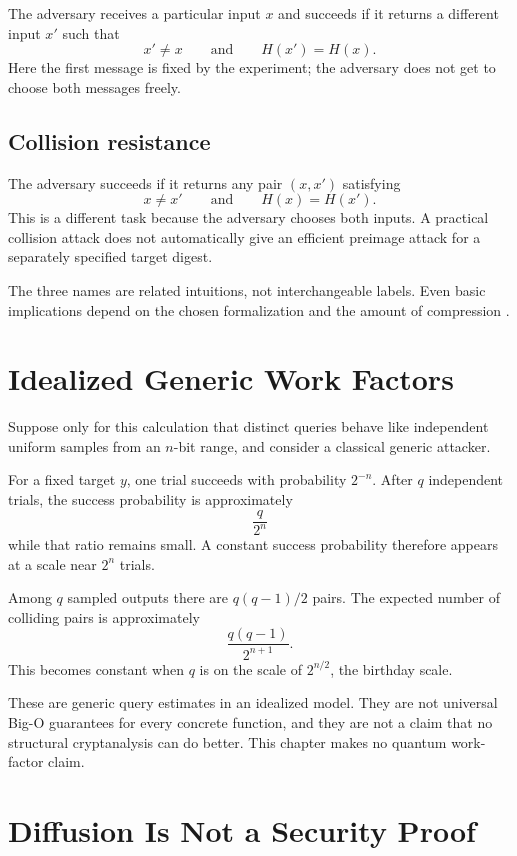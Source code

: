 The adversary receives a particular input \(x\) and succeeds if it returns a
different input \(x'\) such that
\[
    x' \ne x
    \qquad\text{and}\qquad
    H(x') = H(x).
\]
Here the first message is fixed by the experiment; the adversary does not get
to choose both messages freely.

\subsection{Collision resistance}

The adversary succeeds if it returns any pair \((x,x')\) satisfying
\[
    x \ne x'
    \qquad\text{and}\qquad
    H(x) = H(x').
\]
This is a different task because the adversary chooses both inputs. A practical
collision attack does not automatically give an efficient preimage attack for
a separately specified target digest.

The three names are related intuitions, not interchangeable labels. Even basic
implications depend on the chosen formalization and the amount of compression
\cite{rogaway2004hashbasics}.

\section{Idealized Generic Work Factors}

Suppose only for this calculation that distinct queries behave like independent
uniform samples from an \(n\)-bit range, and consider a classical generic
attacker.

For a fixed target \(y\), one trial succeeds with probability \(2^{-n}\). After
\(q\) independent trials, the success probability is approximately
\[
    \frac{q}{2^n}
\]
while that ratio remains small. A constant success probability therefore
appears at a scale near \(2^n\) trials.

Among \(q\) sampled outputs there are \(q(q-1)/2\) pairs. The expected number
of colliding pairs is approximately
\[
    \frac{q(q-1)}{2^{n+1}}.
\]
This becomes constant when \(q\) is on the scale of \(2^{n/2}\), the birthday
scale.

These are generic query estimates in an idealized model. They are not
universal Big-O guarantees for every concrete function, and they are not a
claim that no structural cryptanalysis can do better. This chapter makes no
quantum work-factor claim.

\section{Diffusion Is Not a Security Proof}

